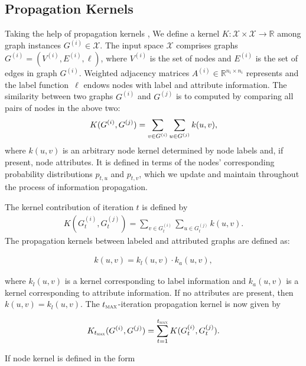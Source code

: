 \documentclass[12pt,a4paper]{article}
\numberwithin{equation}{section}
\numberwithin{figure}{section}
\numberwithin{table}{section}
\newcommand{\bb}[1]{\mathbb{#1}}
\newcommand{\cm}[1]{\mathcal{#1}}
\begin{document}
\subsection{Propagation Kernels}

Taking the help of propagation kernels \citep{Neumann2015}, We define a kernel $K\colon \cm{X} \times \cm{X} \to \bb{R}$ 
among graph instances $G^{(i)} \in \cm{X} $. The input space $\cm{X}$ comprises graphs $G^{(i)} = (V^{(i)},E^{(i)},\ell)$, where $V^{(i)}$ is the set of nodes and $E^{(i)}$ is the set of edges in graph $G^{(i)}$. Weighted adjacency matrices $A^{(i)} \in \bb{R}^{n_i \times n_i}$ represents and the label function~$\ell$ endows nodes with label and attribute information.
The similarity between two graphs $G^{(i)}$ and $G^{(j)}$ is to computed by comparing all pairs of nodes in the above two:
\begin{align}
 K(G^{(i)}, G^{(j)}) =  \sum_{v \in G^{(i)}} \sum_{u \in G^{(j)}} k(u,v),  \notag
\end{align}
where $k(u,v)$ is an arbitrary node kernel determined by node labels
and, if present, node attributes. It is defined in terms of the nodes' corresponding probability distributions $p_{t,u}$ and $p_{t,v}$, which we update and maintain throughout the process of information propagation.

The kernel contribution of iteration $t$ is defined by
\begin{align}
 K(G^{(i)}_t, G^{(j)}_t) =  \sum_{v \in G^{(i)}_t} \sum_{u \in G^{(j)}_t} k(u,v).
 \label{equ:kernel_contib}
\end{align}
The propagation kernels between labeled and attributed graphs are defined as:

\begin{align}
 k(u,v) = k_l(u,v) \cdot k_a(u,v),
 \label{equ:node_kernel}
\end{align}

where $k_l(u,v)$ is a kernel corresponding to label information and
$k_a(u,v)$ is a kernel corresponding to attribute information.  If no
attributes are present, then $k(u,v) = k_l(u,v)$.  The
$t_{\textsc{max}}$-iteration propagation kernel is now given by

\begin{align}
 K_{t_{\textsc{max}}}(G^{(i)}, G^{(j)}) = \sum_{t = 1}^{t_{\textsc{max}}} K(G^{(i)}_t, G^{(j)}_t).
 \label{equ:pk_kernel}
\end{align}


If node kernel is defined in the form 
\end{document}
